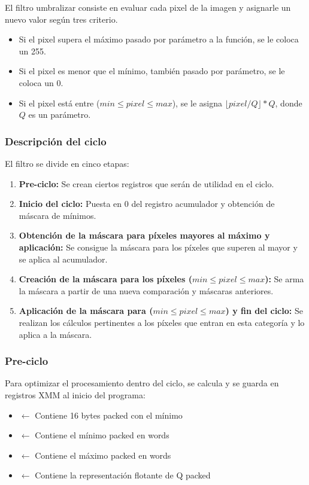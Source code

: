 El filtro umbralizar consiste en evaluar cada pixel de la imagen y asignarle un nuevo valor según tres criterio.

\begin{itemize}
\item Si el pixel supera el máximo pasado por parámetro a la función, se le coloca un 255.
\item Si el pixel es menor que el mínimo, también pasado por parámetro, se le coloca un 0.
\item Si el pixel está entre ($min \leq pixel \leq max$), se le asigna $\lfloor pixel/Q \rfloor * Q$, donde $Q$ es un parámetro.
\end{itemize}


\subsubsection{Descripción del ciclo}

El filtro se divide en cinco etapas:

\begin{enumerate}
\item \textbf{Pre-ciclo:} Se crean ciertos registros que serán de utilidad en el ciclo.
\item \textbf{Inicio del ciclo:} Puesta en 0 del registro acumulador y obtención de máscara de mínimos.
\item \textbf{Obtención de la máscara para píxeles mayores al máximo y aplicación:} Se consigue la máscara para los píxeles que superen al mayor y se aplica al acumulador.
\item \textbf{Creación de la máscara para los píxeles ($min \leq pixel \leq max$):} Se arma la máscara a partir de una nueva comparación y máscaras anteriores.
\item \textbf{Aplicación de la máscara para ($min \leq pixel \leq max$) y fin del ciclo:} Se realizan los cálculos pertinentes a los píxeles que entran en esta categoría y lo aplica a la máscara.
\end{enumerate}


\subsubsection{Pre-ciclo}

Para optimizar el procesamiento dentro del ciclo, se calcula y se guarda en registros XMM al inicio del programa:
\begin{itemize}
  \item {} $\leftarrow$ Contiene 16 bytes packed con el mínimo
  \item {} $\leftarrow$ Contiene el mínimo packed en words
  \item {}  $\leftarrow$ Contiene el máximo packed en words
  \item {}  $\leftarrow$ Contiene la representación flotante de Q packed
\end{itemize}

